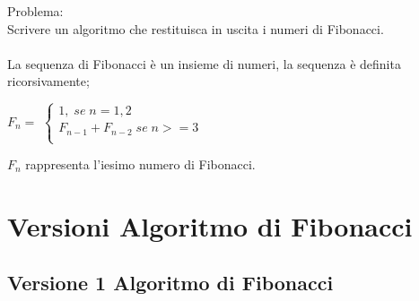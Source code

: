 \documentclass[12pt, letterpaper]{article}
\begin{document}
Problema: 
\\
Scrivere un algoritmo che restituisca in uscita i numeri di Fibonacci.
\\
\\
La sequenza di Fibonacci è un insieme di numeri, la sequenza è definita ricorsivamente;
\\

\begin{center}
   \(F_n = \)
$\left \{
\begin{array}{l}
   1,\; se \; n = 1, 2\\ 
   F_{n-1} + F_{n-2}\; se \;n >= 3\\
\end{array}
\right.$
\end{center}
\(F_n\) rappresenta l'iesimo numero di Fibonacci.
\section{Versioni Algoritmo di Fibonacci}
\subsection{Versione 1 Algoritmo di Fibonacci}
\end{document}

